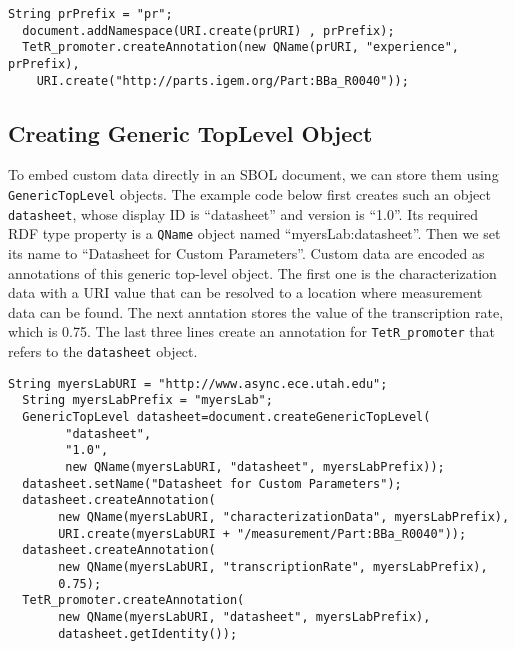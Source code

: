\begin{minipage}{0.95\textwidth} 
\begin{lstlisting}[basicstyle=\footnotesize\ttfamily]
  String prPrefix = "pr";
  document.addNamespace(URI.create(prURI) , prPrefix);
  TetR_promoter.createAnnotation(new QName(prURI, "experience", prPrefix),
	URI.create("http://parts.igem.org/Part:BBa_R0040"));
\end{lstlisting}
\end{minipage}

\subsection*{Creating Generic TopLevel Object}
To embed custom data directly in an SBOL document, we can store them
using \lstinline+GenericTopLevel+ objects. The example code below first
creates such an object \lstinline+datasheet+, whose display ID is
``datasheet'' and version is ``1.0''. Its required RDF type property
is a \lstinline+QName+ object named
``myersLab:datasheet''. Then we set its name to
``Datasheet for Custom Parameters''. Custom data are encoded as annotations of this generic
top-level object. The first one is the characterization data with a
URI value that can be resolved to a location where measurement data
can be found. The next anntation stores the value of the
transcription rate, which is 0.75. The last three lines create
an annotation for \lstinline+TetR_promoter+ that refers to the
\lstinline+datasheet+ object.

\begin{minipage}{0.95\textwidth} 
\begin{lstlisting}[basicstyle=\footnotesize\ttfamily]
  String myersLabURI = "http://www.async.ece.utah.edu";
  String myersLabPrefix = "myersLab";	
  GenericTopLevel datasheet=document.createGenericTopLevel(
        "datasheet",
        "1.0",
        new QName(myersLabURI, "datasheet", myersLabPrefix));
  datasheet.setName("Datasheet for Custom Parameters");		
  datasheet.createAnnotation(
       new QName(myersLabURI, "characterizationData", myersLabPrefix), 
       URI.create(myersLabURI + "/measurement/Part:BBa_R0040"));				
  datasheet.createAnnotation(
       new QName(myersLabURI, "transcriptionRate", myersLabPrefix), 
       0.75);
  TetR_promoter.createAnnotation(
       new QName(myersLabURI, "datasheet", myersLabPrefix), 
       datasheet.getIdentity());
\end{lstlisting}
\end{minipage}





